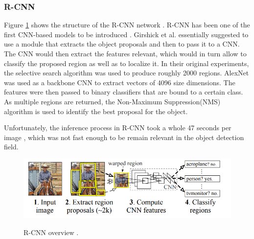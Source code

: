 \FloatBarrier

\subsubsection{R-CNN}

Figure \ref{rcnn} shows the structure of the R-CNN network \cite{Girshick2013}. R-CNN has been one of the first CNN-based models to be introduced \cite{Zaidi2021}. Girshick et al. essentially suggested to use a module that extracts the object proposals and then to pass it to a CNN. The CNN would then extract the features relevant, which would in turn allow to classify the proposed region as well as to localize it. In their original experiments, the selective search algorithm  \cite{Uijlings13} was used to produce roughly 2000 regions. AlexNet  \cite{NIPS2012_c399862d} was used as a backbone CNN to extract vectors of 4096 size dimensions. The features were then passed to binary classifiers that are bound to a certain class. As multiple regions are returned, the Non-Maximum Suppression(NMS) algorithm \cite{Hosang2017} is used to identify the best proposal for the object. 

Unfortunately, the inference process in R-CNN took a whole 47 seconds per image \cite{Girshick2013}, which was not fast enough to be remain relevant in the object detection field. 

\begin{figure}[htb]
	\begin{center}
		\includegraphics[width=12cm]{./rcnn.png}
	\end{center}
	\caption{R-CNN overview \cite{Girshick2013}.}
	\begin{center}
		\label{rcnn}
	\end{center}
\end{figure}
\FloatBarrier



